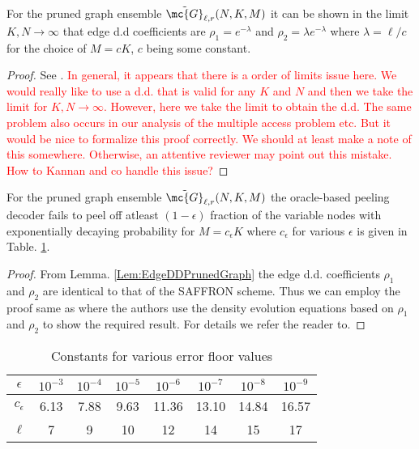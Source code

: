 \documentclass[conference,twocolumn]{IEEEtran}
\def\ceps{c_{\epsilon}}
\def\proofgap{-3ex}
\begin{document}
{\begin{lemma}
\label{Lem:EdgeDDPrunedGraph}
For the pruned graph ensemble $\tilde{\mc{G}}_{\ell,r}(N,K,M)$ it can be shown in the limit $K,N\rightarrow\infty$ that edge d.d coefficients are $\rho_{1}=e^{-\lambda}$ and $\rho_{2}=\lambda e^{-\lambda}$ where $\lambda=\ell/c$ for the choice of $M=cK$, $c$ being some constant.
\end{lemma}
\vspace{\proofgap}
\begin{proof}
See . \textcolor{red}{In general, it appears that there is a order of limits issue here. We would really like to use a d.d. that is valid for any $K$ and $N$ and then we take the limit for $K, N \rightarrow \infty$. However, here we take the limit to obtain the d.d. The same problem also occurs in our analysis of the multiple access problem etc. But it would be nice to formalize this proof correctly. We should at least make a note of this somewhere. Otherwise, an attentive reviewer may point out this mistake. How to Kannan and co handle this issue?}
\end{proof}

\begin{lemma}
For the pruned graph ensemble $\tilde{\mc{G}}_{\ell,r}(N, K,M)$ the oracle-based peeling decoder fails to peel off atleast $(1-\epsilon)$ fraction of the variable nodes with exponentially decaying probability for $M=\ceps K$ where $\ceps$ for various $\epsilon$ is given in Table. \ref{Table:constantsDE}.
\label{Lem:PeelingRegularAnalysis}
\vspace{\proofgap}
\end{lemma}
\begin{proof}
From Lemma. \ref{Lem:EdgeDDPrunedGraph} the edge d.d. coefficients $\rho_1$ and $\rho_2$ are identical to that of the SAFFRON scheme. Thus we can employ the proof same as \cite[Thm.~4.1]{lee2015saffron} where the authors use the density evolution equations based on $\rho_1$ and $\rho_2$ to show the required result. For details we refer the reader to.
\end{proof}

\begin{table}[h!]
\centering
\begin{tabular}{| c | c | c | c | c | c | c | c | }
\hline
$\epsilon$ & $10^{-3}$ & $10^{-4}$ & $10^{-5}$ & $10^{-6}$ &$ 10^{-7}$ & $10^{-8}$ & $10^{-9}$ \\ \hline
$\ceps$ & 6.13 & 7.88 & 9.63 & 11.36 & 13.10 & 14.84 & 16.57 \\ \hline
 $\ell$ & 7 & 9 & 10 & 12 & 14 & 15 & 17 \\ \hline
\end{tabular}
\vspace{1ex}
\caption{Constants for various error floor values}
\label{Table:constantsDE}
\end{table}

}
\end{document}
